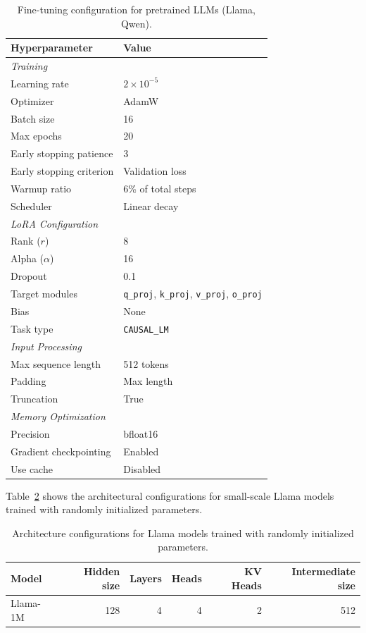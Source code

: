 \documentclass{article}
\theoremstyle{plain}
\theoremstyle{definition}
\theoremstyle{remark}
\begin{document}
\begin{table}[h]
\centering
\caption{Fine-tuning configuration for pretrained LLMs (Llama, Qwen).}
\label{tab:llm_config}
\begin{tabular}{ll}
\toprule
Hyperparameter & Value \\
\midrule
\multicolumn{2}{l}{\textit{Training}} \\
Learning rate & $2 \times 10^{-5}$ \\
Optimizer & AdamW \\
Batch size & 16 \\
Max epochs & 20 \\
Early stopping patience & 3 \\
Early stopping criterion & Validation loss \\
Warmup ratio & 6\% of total steps \\
Scheduler & Linear decay \\
\midrule
\multicolumn{2}{l}{\textit{LoRA Configuration}} \\
Rank ($r$) & 8 \\
Alpha ($\alpha$) & 16 \\
Dropout & 0.1 \\
Target modules & \texttt{q\_proj}, \texttt{k\_proj}, \texttt{v\_proj}, \texttt{o\_proj} \\
Bias & None \\
Task type & \texttt{CAUSAL\_LM} \\
\midrule
\multicolumn{2}{l}{\textit{Input Processing}} \\
Max sequence length & 512 tokens \\
Padding & Max length \\
Truncation & True \\
\midrule
\multicolumn{2}{l}{\textit{Memory Optimization}} \\
Precision & bfloat16 \\
Gradient checkpointing & Enabled \\
Use cache & Disabled \\
\bottomrule
\end{tabular}
\end{table}

Table~\ref{tab:tiny_llm_config} shows the architectural configurations for small-scale Llama models trained with randomly initialized parameters.

\begin{table}[h]
\centering
\caption{Architecture configurations for Llama models trained with randomly initialized parameters.}
\label{tab:tiny_llm_config}
\begin{tabular}{lrrrrr}
\toprule
Model & Hidden size & Layers & Heads & KV Heads & Intermediate size \\
\midrule
Llama-1M & 128 & 4 & 4 & 2 & 512 \\
\bottomrule
\end{tabular}
\end{table}
\end{document}
